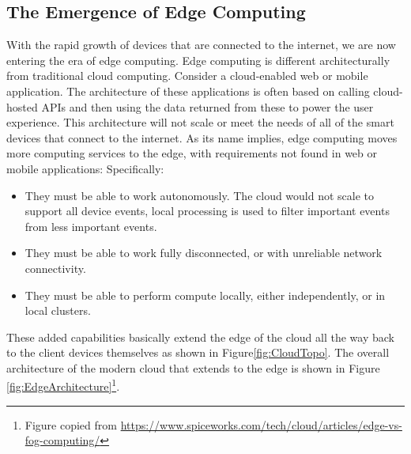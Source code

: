 \documentclass[conference]{IEEEconf}
\begin{document}
\begin{itemize}
\end{itemize}


\subsection{The Emergence of Edge Computing}

With the rapid growth of devices that are connected to the internet, we are now entering the era of edge computing\cite{edgecomputing}. Edge computing is  different architecturally from traditional cloud computing.  Consider a cloud-enabled web or mobile application.  The architecture of these applications is often based on calling cloud-hosted APIs and then using the data returned from these to power the user experience.  This architecture will not scale or meet the needs of all of the smart devices that connect to the internet.  As its name implies, edge computing moves more computing services to the edge, with requirements not found in web or mobile applications:  Specifically:

\begin{itemize}
	\item \vspace{-0.2cm}They must be able to work autonomously. The cloud would not scale to support all device events, local processing is used to filter important events from less important events.
	
	\item \vspace{-0.2cm}They must be able to work fully disconnected, or with unreliable network connectivity.  
	
	\item \vspace{-0.2cm}They must be able to perform compute locally, either independently, or in local clusters. 
\end{itemize}

These added capabilities basically extend the edge of the cloud all the way back to the client devices themselves as shown in Figure\ref{fig:CloudTopo}. The overall architecture of the modern cloud that extends to the edge is shown in Figure \ref{fig:EdgeArchitecture}\footnote{Figure copied from \url{https://www.spiceworks.com/tech/cloud/articles/edge-vs-fog-computing/}}.
\end{document}

